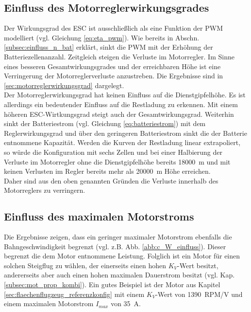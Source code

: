\subsection{Einfluss des Motorreglerwirkungsgrades}
\label{subsec:einfluss_eta_pwm}
Der Wirkungsgrad des ESC ist ausschließlich als eine Funktion der PWM modelliert (vgl. Gleichung \eqref{eq:eta_pwm}). Wie bereits in Abschn. \ref{subsec:einfluss_n_bat} erklärt, sinkt die PWM mit der Erhöhung der Batteriezellenanzahl. Zeitgleich steigen die Verluste im Motorregler. Im Sinne eines besseren Gesamtwirkungsgrades und der erreichbaren Höhe ist eine Verringerung der Motorreglerverluste anzustreben. Die Ergebnisse sind in \ref{sec:motorreglerwirkungsgrad} dargelegt. \\
Der Motorreglerwirkungsgrad hat keinen Einfluss auf die Dienstgipfelhöhe. Es ist allerdings ein bedeutender Einfluss auf die Restladung zu erkennen. Mit einem höheren ESC-Wirtkungsgrad steigt auch der Gesamtwirkungsgrad. Weiterhin sinkt der Batteriestrom (vgl. Gleichung \eqref{eq:batteriestrom}) mit dem Reglerwirkungsgrad und über den geringeren Batteriestrom sinkt die der Batterie entnommene Kapazität. Werden die Kurven der Restladung linear extrapoliert, so würde die Konfiguration mit sechs Zellen und bei einer Halbierung der Verluste im Motorregler ohne die Dienstgipfelhöhe bereits \SI{18000}{m} und mit keinen Verlusten im Regler bereits mehr als \SI{20000}{m} Höhe erreichen. \\
Daher sind aus den oben genannten Gründen die Verluste innerhalb des Motorreglers zu verringern. 


\subsection{Einfluss des maximalen Motorstroms}
\label{subsec:einfluss_imax}
Die Ergebnisse zeigen, dass ein geringer maximaler Motorstrom ebenfalls die Bahngeschwindigkeit begrenzt (vgl. z.B. Abb. \ref{abb:c_W_einfluss}). Dieser begrenzt die dem Motor entnommene Leistung. 
Folglich ist ein Motor für einen solchen Steigflug zu wählen, der einerseits einen hohen \ensuremath{K_V}-Wert besitzt, andererseits aber auch einen hohen maximalen Dauerstrom besitzt (vgl. Kap. \ref{subsec:mot_prop_kombi}). Ein gutes Beispiel ist der Motor aus Kapitel \ref{sec:flaechenflugzeug_referenzkonfig} mit einem \ensuremath{K_V}-Wert von \SI{1390}{RPM/V} und einem maximalen Motorstrom \ensuremath{I_{max}} von \SI{35}{A}.




